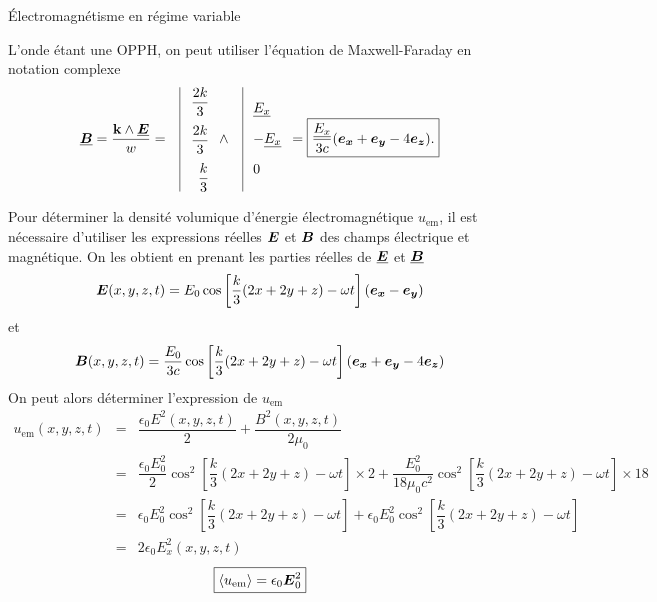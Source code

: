 \begin{corr}{Électromagnétisme en régime variable}
\begin{corrlist}
	\item L'onde étant une OPPH, on peut utiliser l'équation de Maxwell-Faraday
	      en notation complexe
	      \begin{equation*}
		      \complex{\vecb} = \dfrac{\vec{k} \wedge \complex{\vece}}{w} = \quad
		      \vline
		      \begin{array}{r}
			      \dfrac{2k}{3} \\[1em]
			      \dfrac{2k}{3} \\[1em]
			      \dfrac{k}{3}
		      \end{array}
		      \wedge \quad 
		      \vline
		      \begin{array}{l}
			      \complex{E_x} \\[1em]
			      -\complex{E_x} \\[1em]
			      0 
		      \end{array}
		      = \boxed{\dfrac{\complex{E_x}}{3c}(\ex + \ey - 4\ez).}
	     \end{equation*}
	\item Pour déterminer la densité volumique d'énergie électromagnétique
	      $u_\mathrm{em}$, il est nécessaire d'utiliser les expressions
	      réelles $\vece$ et $\vecb$ des champs électrique et magnétique. 
	      On les obtient en prenant les parties réelles de $\complex{\vece}$
	      et $\complex{\vecb}$
	      \begin{equation*}
		      \vece(x, y, z, t) = E_0 \cos\left[
		      \dfrac{k}{3}(2x + 2y +z) - \omega t \right](\ex - \ey)
	      \end{equation*}
	      et
	      \begin{equation*}
		      \vecb(x, y, z, t) = \dfrac{E_0}{3c} \cos\left[
		      \dfrac{k}{3}(2x + 2y +z) - \omega t \right](\ex + \ey - 4\ez)
	      \end{equation*}
	      On peut alors déterminer l'expression de $u_\mathrm{em}$
	      \begin{equation*}
		      \begin{array}{rcl}
			      u_\mathrm{em}(x, y, z, t) &=& 
			\dfrac{\epsilon_0 E^2(x, y, z, t)}{2} 
			+ \dfrac{B^2(x, y, z, t)}{2 \mu_0} \\[1em]
			   &=& \dfrac{\epsilon_0 E_0^2}{2} \cos^2\left[
		      \dfrac{k}{3}(2x + 2y +z) - \omega t \right] \times 2 +
		      \dfrac{E_0^2}{18 \mu_0 c^2} \cos^2\left[
		      \dfrac{k}{3}(2x + 2y +z) - \omega t \right] \times 18 \\[1em]
		      	  &=& \epsilon_0 E_0^2 \cos^2\left[
		      \dfrac{k}{3}(2x + 2y +z) - \omega t \right] +
		      \epsilon_0 E_0 ^2 \cos^2\left[
		      \dfrac{k}{3}(2x + 2y +z) - \omega t \right]\\[1em]
			  &=& 2 \epsilon_0 E_x^2(x, y, z, t)
		      \end{array}
	      \end{equation*}
	      \begin{equation*}
		      \boxed{
		      \langle u_\mathrm{em} \rangle = \epsilon_0 \vece_0^2
	      }
      	     \end{equation*}


\end{corrlist}
\end{corr}
